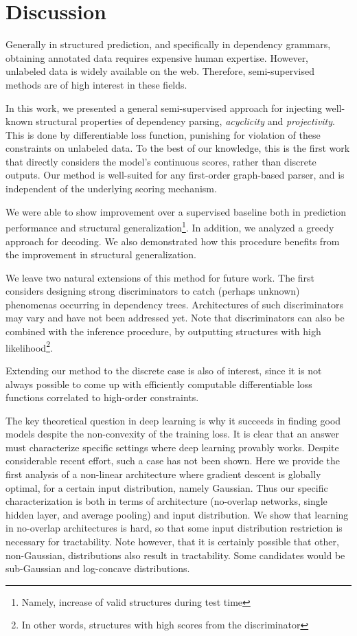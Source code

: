 \chapter{Discussion}
\label{sec:discussion}  

Generally in structured prediction, and specifically in dependency grammars, obtaining annotated data requires expensive human expertise. However, unlabeled data is widely available on the web. Therefore, semi-supervised methods are of high interest in these fields.

In this work, we presented a general semi-supervised approach for injecting well-known structural properties of dependency parsing, \textit{acyclicity} and \textit{projectivity}. This is done by differentiable loss function, punishing for violation of these constraints on unlabeled data. To the best of our knowledge, this is the first work that directly considers the model's continuous scores, rather than discrete outputs. Our method is well-suited for any first-order graph-based parser, and is independent of the underlying scoring mechanism.

We were able to show improvement over a supervised baseline both in prediction performance and structural generalization\footnote{Namely, increase of valid structures during test time}. In addition, we analyzed a greedy approach for decoding.
We also demonstrated how this procedure benefits from the improvement in structural generalization.

We leave two natural extensions of this method for future work. The first considers designing strong discriminators to catch (perhaps unknown) phenomenas occurring in dependency trees. Architectures of such discriminators may vary and have not been addressed yet. Note that discriminators can also be combined with the inference procedure, by outputting structures with high likelihood\footnote{In other words, structures with high scores from the discriminator}.

Extending our method to the discrete case is also of interest, since it is not always possible to come up with efficiently computable differentiable loss functions correlated to high-order constraints.

\iffalse
The key theoretical question in deep learning is why it succeeds in finding good models despite the non-convexity of the training loss. It is clear
that an answer must characterize specific settings where deep learning provably works. Despite considerable recent effort, such a case has not been shown. Here
we provide the first analysis of a non-linear architecture where gradient descent is globally optimal, for a certain input distribution, namely Gaussian. Thus our specific
characterization is both in terms of architecture (no-overlap networks, single hidden layer, and average pooling) and input distribution. We show that  
learning in no-overlap architectures is hard, so that some input distribution restriction is necessary for tractability. Note however, that it is certainly possible
that other, non-Gaussian, distributions also result in tractability. Some candidates would be sub-Gaussian and log-concave distributions.


